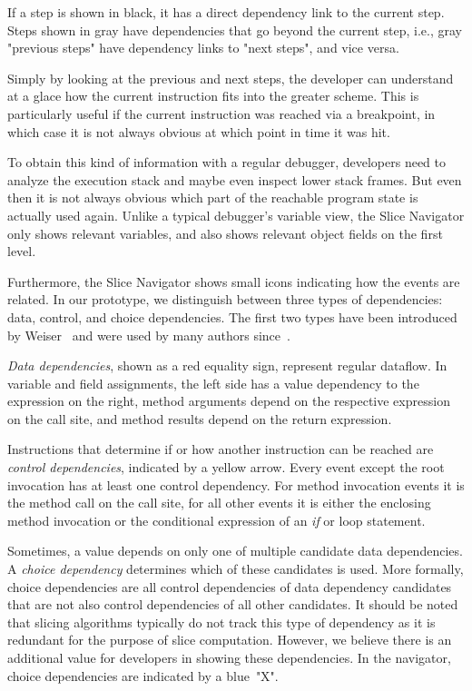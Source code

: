 \documentclass[
			english,
			review,
			]{elsarticle}
\begin{document}
If a step is shown in black, it has a direct dependency link to the current step.
Steps shown in gray have dependencies that go beyond the current step, i.e., gray "previous steps" have dependency links to "next steps", and vice versa.

Simply by looking at the previous and next steps, the developer can understand at a glace how the current instruction fits into the greater scheme.
This is particularly useful if the current instruction was reached via a breakpoint, in which case it is not always obvious at which point in time it was hit.

To obtain this kind of information with a regular debugger, developers need to analyze the execution stack and maybe even inspect lower stack frames.
But even then it is not always obvious which part of the reachable program state is actually used again.
Unlike a typical debugger's variable view, the Slice Navigator only shows relevant variables, and also shows relevant object fields on the first level.

Furthermore, the Slice Navigator shows small icons indicating how the events are related.
In our prototype, we distinguish between three types of dependencies: data, control, and choice dependencies.
The first two types have been introduced by Weiser~\cite{weiser_program_1981} and were used by many authors since~\cite{agrawal_dynamic_1990, korel_dynamic_1990, zhang_precise_2003}.

\emph{Data dependencies}, shown as a red equality sign, represent regular dataflow.
In variable and field assignments, the left side has a value dependency to the expression on the right, method arguments depend on the respective expression on the call site, and method results depend on the return expression.

Instructions that determine if or how another instruction can be reached are \emph{control dependencies}, indicated by a yellow arrow.
Every event except the root invocation has at least one control dependency.
For method invocation events it is the method call on the call site, for all other events it is either the enclosing method invocation or the conditional expression of an \emph{if} or loop statement.

Sometimes, a value depends on only one of multiple candidate data dependencies. 
A \emph{choice dependency} determines which of these candidates is used.
More formally, choice dependencies are all control dependencies of data dependency candidates that are not also control dependencies of all other candidates.
It should be noted that slicing algorithms typically do not track this type of dependency as it is redundant for the purpose of slice computation.
However, we believe there is an additional value for developers in showing these dependencies.
In the navigator, choice dependencies are indicated by a blue~"X".
\end{document}
